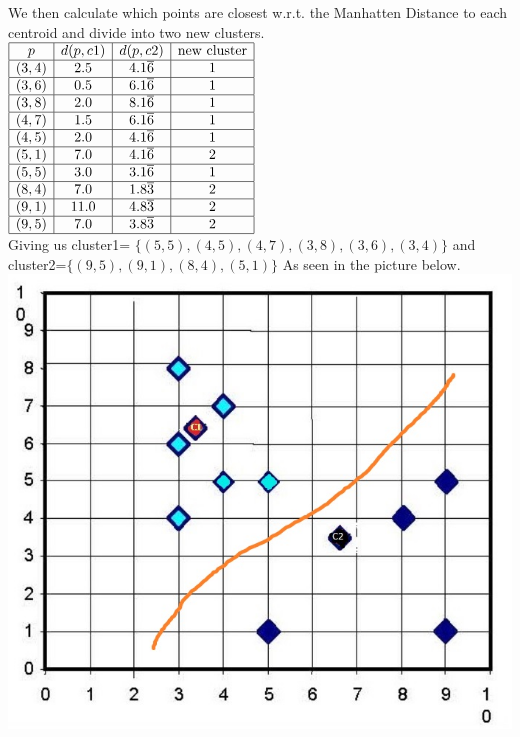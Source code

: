 \documentclass{article}
\theoremstyle{remark}
\begin{document}
	We then calculate which points are closest w.r.t. the Manhatten Distance to each centroid and divide into two new clusters.\\ 
	$\begin{array}{|c|c|c|c|}\hline
	p & d(p,c1) & d(p,c2) & \text{new cluster} \\\hline
	(3,4) &2.5 &4.1\overline{6} & 1\\\hline
	(3,6) &0.5 &6.1\overline{6} & 1\\\hline
	(3,8) &2.0 &8.1\overline{6} & 1\\\hline
	(4,7) &1.5 &6.1\overline{6} & 1\\\hline
	(4,5) &2.0 &4.1\overline{6} & 1\\\hline
	(5,1) &7.0 &4.1\overline{6} & 2\\\hline
	(5,5) &3.0 &3.1\overline{6}  & 1\\\hline
	(8,4) &7.0 &1.8\overline{3}  & 2\\\hline
	(9,1) &11.0 &4.8\overline{3}  &  2\\\hline
	(9,5) &7.0 &3.8\overline{3}  & 2\\\hline
	\end{array}$\\
	Giving us cluster1= $\{ (5,5), (4,5), (4,7), (3,8), (3,6), (3,4) \}$ and cluster2=$\{ (9,5), (9,1), (8,4), (5,1)\}$ As seen in the picture below. \\
	\includegraphics[scale = 0.5]{updates.jpg}\\
\end{document}
